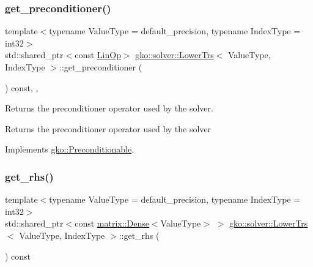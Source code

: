 \subsubsection{\texorpdfstring{get\+\_\+preconditioner()}{get\_preconditioner()}}
{\footnotesize\ttfamily template$<$typename Value\+Type  = default\+\_\+precision, typename Index\+Type  = int32$>$ \\
std\+::shared\+\_\+ptr$<$const \hyperlink{classgko_1_1LinOp}{Lin\+Op}$>$ \hyperlink{classgko_1_1solver_1_1LowerTrs}{gko\+::solver\+::\+Lower\+Trs}$<$ Value\+Type, Index\+Type $>$\+::get\+\_\+preconditioner (\begin{DoxyParamCaption}{ }\end{DoxyParamCaption}) const\hspace{0.3cm}{\ttfamily [inline]}, {\ttfamily [override]}, {\ttfamily [virtual]}}



Returns the preconditioner operator used by the solver. 

\begin{DoxyReturn}{Returns}
the preconditioner operator used by the solver 
\end{DoxyReturn}


Implements \hyperlink{classgko_1_1Preconditionable_ad9545089aef0dfc83bc7a74e5bf1d748}{gko\+::\+Preconditionable}.

\mbox{\label{classgko_1_1solver_1_1LowerTrs_affe671fab87e0afe2fc1cd0cb125fcc5}} 
\subsubsection{\texorpdfstring{get\+\_\+rhs()}{get\_rhs()}}
{\footnotesize\ttfamily template$<$typename Value\+Type  = default\+\_\+precision, typename Index\+Type  = int32$>$ \\
std\+::shared\+\_\+ptr$<$const \hyperlink{classgko_1_1matrix_1_1Dense}{matrix\+::\+Dense}$<$Value\+Type$>$ $>$ \hyperlink{classgko_1_1solver_1_1LowerTrs}{gko\+::solver\+::\+Lower\+Trs}$<$ Value\+Type, Index\+Type $>$\+::get\+\_\+rhs (\begin{DoxyParamCaption}{ }\end{DoxyParamCaption}) const\hspace{0.3cm}{\ttfamily [inline]}}



